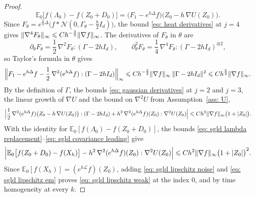 \begin{proof}
    \begin{equation*}
        \mathbb E_0\bigl[ f(\Lambda_0) - f(Z_0 + D_0) \bigr] = \bigl( F_1 - e^{h\Delta} f \bigr)\bigl( Z_0 - h\, \nabla U(Z_0) \bigr) .
    \end{equation*}
    Since $F_\theta = e^{\frac h4 \Delta} \bigl( f * \mathcal N(0, \Gamma_\theta - \frac h2 I_d) \bigr)$, the bound \eqref{eq: heat derivatives} at $j = 4$ gives $\lVert \nabla^4 F_\theta \rVert_\infty \leqslant C h^{-\frac32} \lVert \nabla f \rVert_\infty$. The derivatives of $F_\theta$ in $\theta$ are
    \begin{equation*}
        \partial_\theta F_\theta = \frac12\, \nabla^2 F_\theta : ( \Gamma - 2h I_d ) , \qquad \partial_\theta^2 F_\theta = \frac14\, \nabla^4 F_\theta : ( \Gamma - 2h I_d )^{\otimes 2} ,
    \end{equation*}
    so Taylor's formula in $\theta$ gives
    \begin{equation}
        \Bigl\| F_1 - e^{h\Delta} f - \frac12\, \nabla^2 ( e^{h\Delta} f ) : ( \Gamma - 2h I_d ) \Bigr\|_\infty \leqslant C h^{-\frac32} \lVert \nabla f \rVert_\infty\, \lVert \Gamma - 2h I_d \rVert^2 \leqslant C h^{\frac52} \lVert \nabla f \rVert_\infty .
        \label{eq: sgld covariance interpolation}
    \end{equation}
    By the definition of $\Gamma$, the bounds \eqref{eq: gaussian derivatives} at $j = 2$ and $j = 3$, the linear growth of $\nabla U$ and the bound on $\nabla^2 U$ from Assumption~\ref{ass: U},
    \begin{equation}
        \Bigl| \frac12\, \nabla^2 ( e^{h\Delta} f )\bigl( Z_0 - h\, \nabla U(Z_0) \bigr) : ( \Gamma - 2h I_d ) + h^2\, \nabla^2 ( e^{h\Delta} f )(Z_0) : \nabla^2 U(Z_0) \Bigr| \leqslant C h^2 \lVert \nabla f \rVert_\infty \bigl( 1 + |Z_0| \bigr) .
        \label{eq: sgld covariance leading}
    \end{equation}
    With the identity for $\mathbb E_0[ f(\Lambda_0) - f(Z_0 + D_0) ]$, the bounds \eqref{eq: sgld lambda replacement}--\eqref{eq: sgld covariance leading} give
    \begin{equation}
        \Bigl| \mathbb E_0\bigl[ f(Z_0 + D_0) - f(X_h) \bigr] - h^2\, \nabla^2 ( e^{h\Delta} f )(Z_0) : \nabla^2 U(Z_0) \Bigr| \leqslant C h^2 \lVert \nabla f \rVert_\infty \bigl( 1 + |Z_0| \bigr)^2 .
        \label{eq: sgld lipschitz em}
    \end{equation}
    Since $\mathbb E_0[f(X_h)] = (e^{h\mathcal L} f)(Z_0)$, adding \eqref{eq: sgld lipschitz noise} and \eqref{eq: sgld lipschitz em} proves \eqref{eq: sgld lipschitz weak} at the index $0$, and by time homogeneity at every $k$.
\end{proof}

